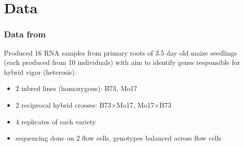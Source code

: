 \documentclass[handout]{beamer}
\begin{document}
\section{Data}
\begin{frame}%
  \frametitle{Data from \citet{paschold}}
  Produced 16 RNA samples from primary roots of 3.5 day old maize seedlings (each produced from 10 individuals) with aim to identify genes responsible for hybrid vigor (heterosis).
  \vspace{.5cm}
  \pause\begin{beamerboxesrounded}[upper=upcol,lower=lowcol,shadow=true]{}
  \begin{itemize}
    \item 2 inbred lines (homozygous): B73, Mo17
    \item 2 reciprocal hybrid crosses: B73$\times$Mo17, Mo17$\times$B73
    \item 4 replicates of each variety
    \item sequencing done on 2 flow cells, genotypes balanced across flow cells
  \end{itemize}
  \end{beamerboxesrounded}
\end{frame}
\end{document}
